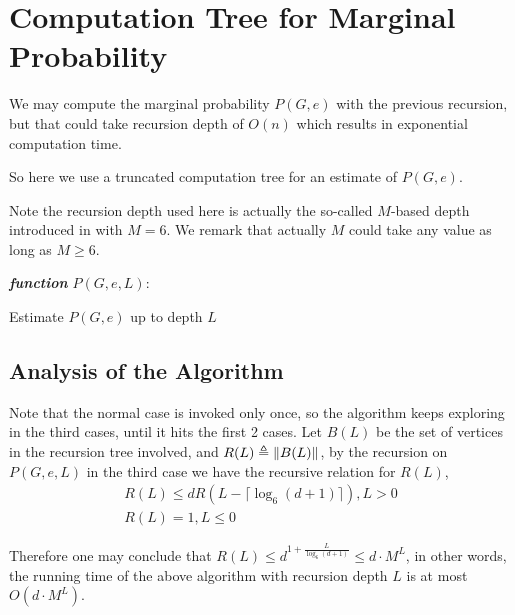 
\section{Computation Tree for Marginal Probability}

We may compute the marginal probability $P(G, e)$ with the previous recursion, but
that could take recursion depth of $O(n)$ which results in exponential computation time.

So here we use a truncated computation tree for an estimate of $P(G,e)$.

Note the recursion depth used here is actually the so-called $M$-based depth introduced in \cite{LLY12} with $M=6$. We remark that actually $M$ could take any value as long as $M \geq 6$.

\IncMargin{1em}
\begin{algorithm}[H]
\emph{ \textbf{function} $P(G, e, L):$}
\BlankLine
{}
 \caption{Estimate $P(G,e)$ up to depth $L$}
\end{algorithm}
\DecMargin{1em}

\subsection{Analysis of the Algorithm}
Note that the normal case is invoked only once, so the algorithm keeps exploring in the third cases, until it hits the first 2 cases. Let $B(L)$ be the set of vertices in the recursion tree involved, and $R(L) \triangleq \left\Vert B(L)\right\Vert$,
 by the recursion on $P(G,e,L)$ in the third case we have the recursive relation for $R(L)$,
 \begin{align*}
	 R(L) \leq d R(L-\lceil \log_6{(d+1)} \rceil) , L > 0\\
	 R(L) = 1, L\leq 0
 \end{align*}

 Therefore one may conclude that $R(L) \leq d^{1+\frac{L}{\log_6{(d+1)}}} \leq d\cdot M^L$, in other words, the running time of the above algorithm with recursion depth $L$ is at most $O(d\cdot M^L)$.
